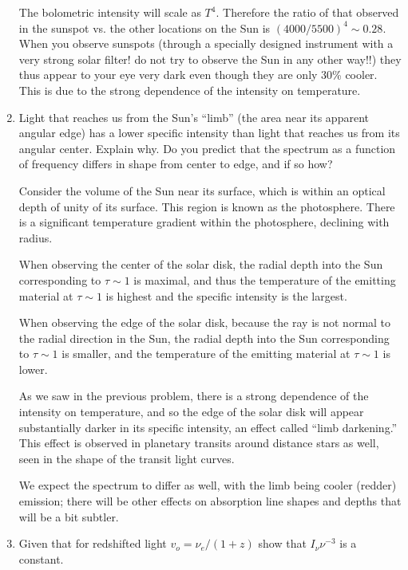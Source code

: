 \documentclass[11pt, preprint]{article}
\begin{document}
\begin{enumerate}
\begin{answer}
The bolometric intensity will scale as $T^4$. Therefore the ratio of
that observed in the sunspot vs. the other locations on the Sun is
$(4000/5500)^4 \sim 0.28$. When you observe sunspots (through a
specially designed instrument with a very strong solar filter! do not
try to observe the Sun in any other way!!) they thus appear to your
eye very dark even though they are only 30\% cooler. This is due to
the strong dependence of the intensity on temperature.
\end{answer}
\item Light that reaches us from the Sun's ``limb'' (the area near its
  apparent angular edge) has a lower specific intensity than light
  that reaches us from its angular center. Explain why. Do you predict
  that the spectrum as a function of frequency differs in shape from
  center to edge, and if so how?

\begin{answer}
Consider the volume of the Sun near its surface, which is within an
optical depth of unity of its surface. This region is known as the
photosphere. There is a significant temperature gradient within the
photosphere, declining with radius. 

When observing the center of the solar disk, the radial depth into the
Sun corresponding to $\tau \sim 1$ is maximal, and thus the
temperature of the emitting material at $\tau\sim 1$ is highest and
the specific intensity is the largest.

When observing the edge of the solar disk, because the ray is not
normal to the radial direction in the Sun, the radial depth into the
Sun corresponding to $\tau\sim 1$ is smaller, and the temperature  of
the emitting material at $\tau\sim 1$ is lower.

As we saw in the previous problem, there is a strong dependence of the
intensity on temperature, and so the edge of the solar disk will
appear substantially darker in its specific intensity, an effect
called ``limb darkening.'' This effect is observed in planetary
transits around distance stars as well, seen in the shape of the
transit light curves.

We expect the spectrum to differ as well, with the limb being cooler
(redder) emission; there will be other effects on absorption line
shapes and depths that will be a bit subtler.
\end{answer}

\item Given that for redshifted light $v_o = \nu_e / (1+z)$ show that
  $I_\nu \nu^{-3}$ is a constant. 


\end{enumerate}
\end{document}
